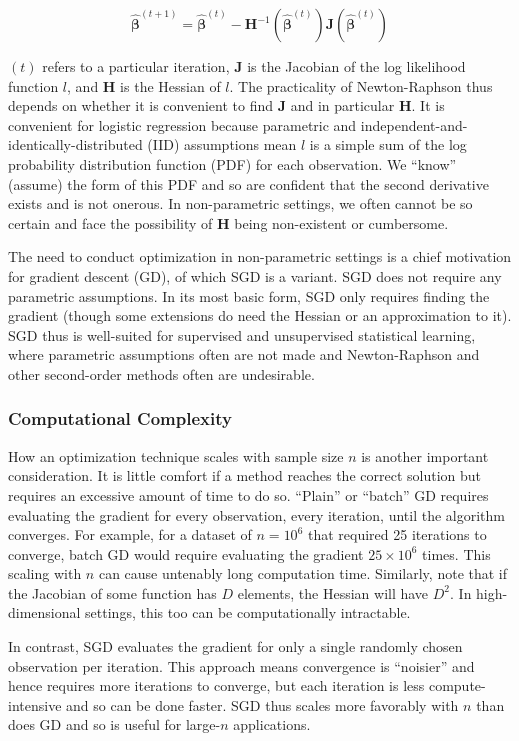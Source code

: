 \documentclass{article}
\begin{document}
$$
\hat{\bm{\beta}}^{(t+1)} = \hat{\bm{\beta}}^{(t)} -
\bm{H}^{-1}(\hat{\bm{\beta}}^{(t)})\bm{J}(\hat{\bm{\beta}}^{(t)})
$$

$(t)$ refers to a particular iteration, $\bm{J}$ is the Jacobian of the
log likelihood function $l$,
and $\bm{H}$ is the Hessian of $l$. The practicality of Newton-Raphson thus depends on whether it is convenient to
find $\bm{J}$ and in particular $\bm{H}$. It is convenient for logistic regression
because parametric and independent-and-identically-distributed (IID) assumptions
mean $l$ is a simple sum of the log probability distribution
function (PDF) for each observation. We ``know'' (assume) the form of this PDF and so are
confident that the second derivative exists and is not onerous.
In non-parametric settings, we often cannot be so certain and face the possibility of
$\bm{H}$ being non-existent or cumbersome.

The need to conduct optimization in non-parametric settings is a chief
motivation for gradient descent (GD), of which SGD is a variant. SGD does not require any parametric assumptions. 
In its most basic form, SGD only requires finding the gradient (though some extensions
do need the Hessian or an approximation to it). 
SGD thus is well-suited for supervised and unsupervised statistical
learning, where parametric assumptions often are not made and 
Newton-Raphson and other second-order methods often are undesirable. 

\subsubsection{Computational Complexity}

How an optimization technique scales with sample size $n$ is another important
consideration. It is little comfort if a method reaches the correct solution but
requires an excessive amount of time to do so. ``Plain'' or
``batch'' GD requires evaluating the gradient for every observation,
every iteration, until the algorithm converges. For example, for a
dataset of $n=10^6$ that required 25 iterations to converge, batch GD would require 
evaluating the gradient $25 \times 10^6$ times. This scaling with
$n$ can cause untenably long computation time. Similarly, note that if the
Jacobian of some function has $D$ elements, the Hessian will have $D^2$. In
high-dimensional settings, this too can be computationally intractable.

In contrast, SGD evaluates the gradient for only a single randomly chosen observation per iteration. This
approach means convergence is ``noisier'' and hence requires more iterations to
converge, but each iteration is less compute-intensive and so can be done
faster. SGD thus scales more favorably with $n$ than does GD and so is
useful for large-$n$ applications.
\end{document}
